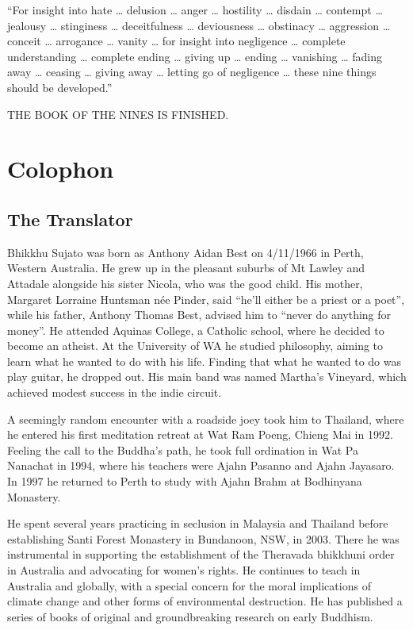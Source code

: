 \documentclass[12pt,openany]{book}%
\newcommand*{\scendbook}[1]{\begin{center}\uppercase{#1}\end{center}}
\let\oldbackmatter\backmatter
\renewcommand{\backmatter}{%
\chapterfont{\setstretch{.85}\normalfont\centering}%
\sectionfont{\setstretch{.85}\Semiboldsubheadfont}%
\oldbackmatter}
\begin{document}
“For insight into hate … delusion … anger … hostility … disdain … contempt … jealousy … stinginess … deceitfulness … deviousness … obstinacy … aggression … conceit … arrogance … vanity … for insight into negligence … complete understanding … complete ending … giving up … ending … vanishing … fading away … ceasing … giving away … letting go of negligence … these nine things should be developed.” 

\scendbook{The Book of the Nines is finished. }

%
\backmatter%
\chapter*{Colophon}

\section*{The Translator}

Bhikkhu Sujato was born as Anthony Aidan Best on 4/11/1966 in Perth, Western Australia. He grew up in the pleasant suburbs of Mt Lawley and Attadale alongside his sister Nicola, who was the good child. His mother, Margaret Lorraine Huntsman née Pinder, said “he’ll either be a priest or a poet”, while his father, Anthony Thomas Best, advised him to “never do anything for money”. He attended Aquinas College, a Catholic school, where he decided to become an atheist. At the University of WA he studied philosophy, aiming to learn what he wanted to do with his life. Finding that what he wanted to do was play guitar, he dropped out. His main band was named Martha’s Vineyard, which achieved modest success in the indie circuit. 

A seemingly random encounter with a roadside joey took him to Thailand, where he entered his first meditation retreat at Wat Ram Poeng, Chieng Mai in 1992. Feeling the call to the Buddha’s path, he took full ordination in Wat Pa Nanachat in 1994, where his teachers were Ajahn Pasanno and Ajahn Jayasaro. In 1997 he returned to Perth to study with Ajahn Brahm at Bodhinyana Monastery. 

He spent several years practicing in seclusion in Malaysia and Thailand before establishing Santi Forest Monastery in Bundanoon, NSW, in 2003. There he was instrumental in supporting the establishment of the Theravada bhikkhuni order in Australia and advocating for women’s rights. He continues to teach in Australia and globally, with a special concern for the moral implications of climate change and other forms of environmental destruction. He has published a series of books of original and groundbreaking research on early Buddhism. 
\end{document}
